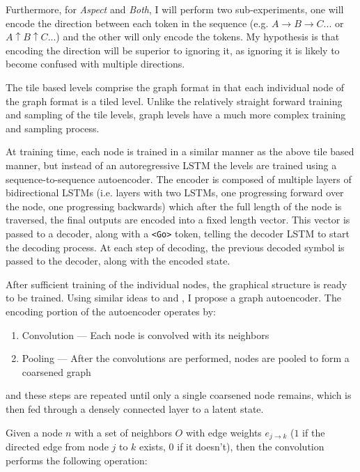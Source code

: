 \documentclass[a4paper]{article}
\begin{document}
Furthermore, for \textit{Aspect} and \textit{Both}, I will perform two sub-experiments, one will encode the direction  between each token in the sequence (e.g. $A \rightarrow B \rightarrow C ...$ or $A \uparrow B \uparrow C ...$) and the other will only encode the tokens.  My hypothesis is that encoding the direction will be superior to ignoring it, as ignoring it is likely to become confused with multiple directions.

The tile based levels comprise the graph format in that each individual node of the graph format is a tiled level.  Unlike the relatively straight forward training and sampling of the tile levels, graph levels have a much more complex training and sampling process.  

At training time, each node is trained in a similar manner as the above tile based manner, but instead of an autoregressive LSTM the levels are trained using a sequence-to-sequence autoencoder.  The encoder is composed of multiple layers of bidirectional LSTMs (i.e. layers with two LSTMs, one progressing forward over the node, one progressing backwards) which after the full length of the node is traversed, the final outputs are encoded into a fixed length vector.  This vector is passed to a decoder, along with a \texttt{<Go>} token, telling the decoder LSTM to start the decoding process.  At each step of decoding, the previous decoded symbol is passed to the decoder, along with the encoded state.  

After sufficient training of the individual nodes, the graphical structure is ready to be trained.  Using similar ideas to \cite{thomaskipfgraphconvolutions} and \cite{treestructuredvariationalautoencoder}, I propose a graph autoencoder.  The encoding portion of the autoencoder operates by:

\begin{enumerate}
\item Convolution --- Each node is convolved with its neighbors
\item Pooling --- After the convolutions are performed, nodes are pooled to form a coarsened graph
\end{enumerate}

  
\noindent and these steps are repeated until only a single coarsened node remains, which is then fed through a densely connected layer to a latent state.

Given a node $n$ with a set of neighbors $O$ with edge weights $e_{j\rightarrow k}$ ($1$ if the directed edge from node $j$ to $k$ exists, $0$ if it doesn't), then the convolution performs the following operation:
\end{document}
